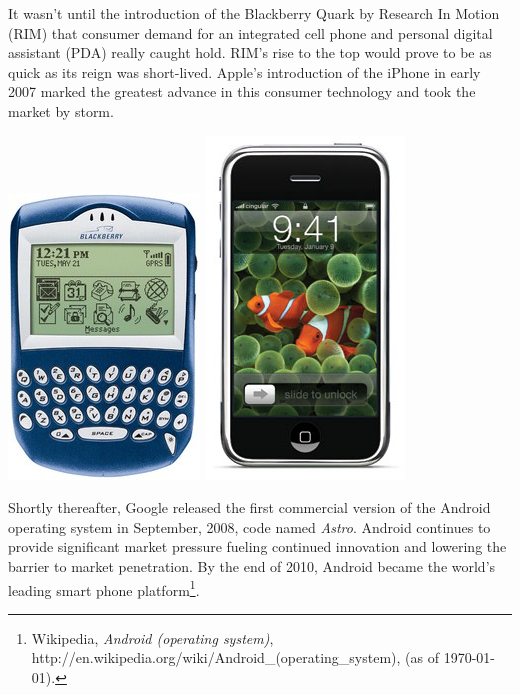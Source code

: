 \documentclass[letterpaper,12pt]{article}
\begin{document}
It wasn't until the introduction of the Blackberry Quark by Research In Motion (RIM) that consumer demand for an integrated cell phone and personal digital assistant (PDA) really caught hold.  RIM's rise to the top would prove to be as quick as its reign was short-lived.  Apple's introduction of the iPhone in early 2007 marked the greatest advance in this consumer technology and took the market by storm. 

\begin{center}
\includegraphics[scale=0.8]{images/blackberry_6200}
\includegraphics[scale=0.6]{images/apple-iphone}
\end{center}

Shortly thereafter, Google released the first commercial version of the Android operating system in September, 2008, code named \emph{Astro}.  Android continues to provide significant market pressure fueling continued innovation and lowering the barrier to market penetration.  By the end of 2010, Android became the world's leading smart phone platform\footnote{Wikipedia, \emph{Android (operating system)}, http://en.wikipedia.org/wiki/Android\_(operating\_system), (as of \today).}.
\end{document}
